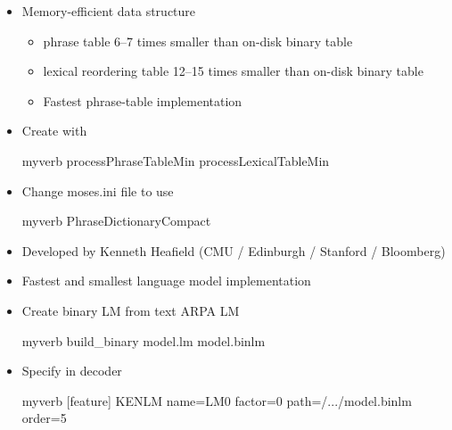 \documentclass[landscape]{uedslides2C}
\begin{document}

\begin{itemize}
\item Memory-efficient data structure
\begin{itemize}
\item phrase table 6--7 times smaller than on-disk binary table
\item lexical reordering table 12--15 times smaller than on-disk binary table
\item Fastest phrase-table implementation
\end{itemize}
\item Create with
\begin{center}
\begin{SaveVerbatim}{myverb} 
processPhraseTableMin
processLexicalTableMin
\end{SaveVerbatim}
\colorbox{gray}{}
\end{center}
\item Change moses.ini file to use
\begin{center}
\begin{SaveVerbatim}{myverb} 
PhraseDictionaryCompact
\end{SaveVerbatim}
\colorbox{gray}{}
\end{center}
\end{itemize}




\vspace{10mm}
\begin{itemize}
\item Developed by Kenneth Heafield (CMU / Edinburgh / Stanford / Bloomberg)
\item Fastest and smallest language model implementation
\item Create binary LM from text ARPA LM\\[5mm]
\begin{SaveVerbatim}{myverb} 
build_binary model.lm model.binlm
\end{SaveVerbatim}
\colorbox{gray}{}
\item Specify in decoder\\[5mm]
\begin{SaveVerbatim}{myverb} 
[feature]
KENLM name=LM0 factor=0 path=/.../model.binlm order=5
\end{SaveVerbatim}
\colorbox{gray}{}
\end{itemize}
\end{document}
